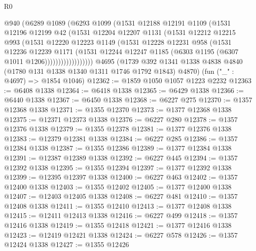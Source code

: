 \begin{lexlean}{R0}
\begin{coremodule}
                @940
                (@6289
                  @1089
                  (@6293
                    @1099
                    (@1531
                      @12188
                      @12191
                      @1109
                      (@1531
                        @12196
                        @12199
                        @42
                        (@1531
                          @12204
                          @12207
                          @1131
                          (@1531
                            @12212
                            @12215
                            @993
                            (@1531
                              @12220
                              @12223
                              @1149
                              (@1531
                                @12228
                                @12231
                                @958
                                (@1531
                                  @12236
                                  @12239
                                  @1171
                                  (@1531
                                    @12244
                                    @12247
                                    @1185
                                    (@6303 @1195 (@6307 @1011 @1206))))))))))))))))))
    @4695
    (@1739 @392 @1341 @1338 @4838 @4840 (@1780 @131 @1338 @1340 @1311 @1746 @1792 @1843) @4870)
    (fun ("_" : @4697) => @1854 @1046)
@12362 := @1859 @1050 @1057 @1223 @2232
@12363 := @6408 @1338
@12364 := @6418 @1338
@12365 := @6429 @1338
@12366 := @6440 @1338
@12367 := @6450 @1338
@12368 := @6227 @275
@12370 := @1357 @12368 @1338
@12371 := @1355 @12370
@12373 := @1377 @12368 @1338
@12375 := @12371 @12373 @1338
@12376 := @6227 @280
@12378 := @1357 @12376 @1338
@12379 := @1355 @12378
@12381 := @1377 @12376 @1338
@12383 := @12379 @12381 @1338
@12384 := @6227 @285
@12386 := @1357 @12384 @1338
@12387 := @1355 @12386
@12389 := @1377 @12384 @1338
@12391 := @12387 @12389 @1338
@12392 := @6227 @445
@12394 := @1357 @12392 @1338
@12395 := @1355 @12394
@12397 := @1377 @12392 @1338
@12399 := @12395 @12397 @1338
@12400 := @6227 @463
@12402 := @1357 @12400 @1338
@12403 := @1355 @12402
@12405 := @1377 @12400 @1338
@12407 := @12403 @12405 @1338
@12408 := @6227 @481
@12410 := @1357 @12408 @1338
@12411 := @1355 @12410
@12413 := @1377 @12408 @1338
@12415 := @12411 @12413 @1338
@12416 := @6227 @499
@12418 := @1357 @12416 @1338
@12419 := @1355 @12418
@12421 := @1377 @12416 @1338
@12423 := @12419 @12421 @1338
@12424 := @6227 @578
@12426 := @1357 @12424 @1338
@12427 := @1355 @12426

\end{coremodule}
\end{lexlean}
